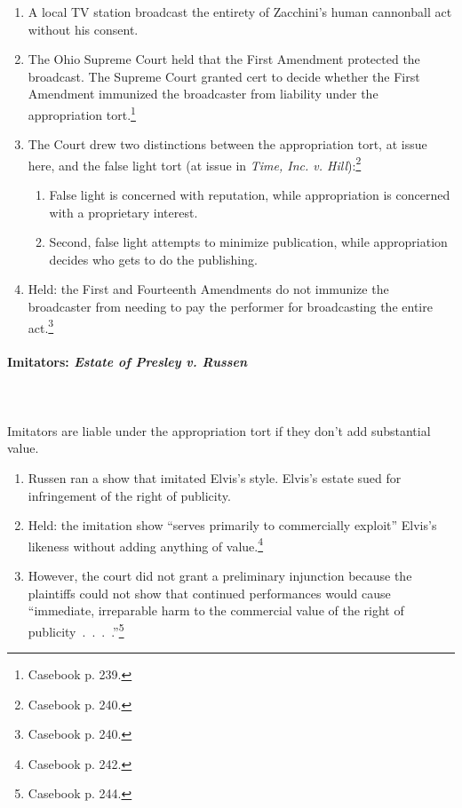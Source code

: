 \begin{enumerate}
    \item A local TV station broadcast the entirety of Zacchini's human 
    cannonball act without his consent.
    \item The Ohio Supreme Court held that the First Amendment protected the 
    broadcast. The Supreme Court granted cert to decide whether the First 
    Amendment immunized the broadcaster from liability under the appropriation 
    tort.\footnote{Casebook p. 239.}
    \item The Court drew two distinctions between the appropriation tort, at 
    issue here, and the false light tort (at issue in \emph{Time, Inc. v. 
    Hill}):\footnote{Casebook p. 240.}
    \begin{enumerate}
        \item False light is concerned with reputation, while appropriation is 
        concerned with a proprietary interest.
        \item Second, false light attempts to minimize publication, while 
        appropriation decides who gets to do the publishing.
    \end{enumerate}
    \item Held: the First and Fourteenth Amendments do not immunize the 
    broadcaster from needing to pay the performer for broadcasting the entire 
    act.\footnote{Casebook p. 240.}
\end{enumerate}

\paragraph{Imitators: \emph{Estate of Presley v. Russen}}
~\\\\
Imitators are liable under the appropriation tort if they don't add substantial 
value.

\begin{enumerate}
    \item Russen ran a show that imitated Elvis's style. Elvis's estate sued for 
    infringement of the right of publicity.
    \item Held: the imitation show ``serves primarily to commercially exploit'' 
    Elvis's likeness without adding anything of value.\footnote{Casebook p. 
    242.}
    \item However, the court did not grant a preliminary injunction because the 
    plaintiffs could not show that continued performances would cause 
    ``immediate, irreparable harm to the commercial value of the right of 
    publicity~.~.~.~.''\footnote{Casebook p. 244.}
\end{enumerate}
